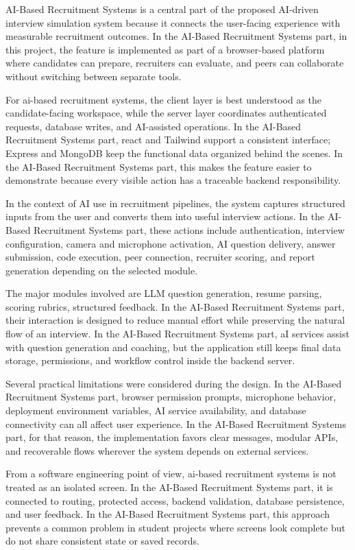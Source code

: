 \documentclass[12pt,a4paper]{report}
\begin{document}
AI-Based Recruitment Systems is a central part of the proposed AI-driven interview simulation system because it connects the user-facing experience with measurable recruitment outcomes. In the AI-Based Recruitment Systems part, in this project, the feature is implemented as part of a browser-based platform where candidates can prepare, recruiters can evaluate, and peers can collaborate without switching between separate tools.


For ai-based recruitment systems, the client layer is best understood as the candidate-facing workspace, while the server layer coordinates authenticated requests, database writes, and AI-assisted operations. In the AI-Based Recruitment Systems part, react and Tailwind support a consistent interface; Express and MongoDB keep the functional data organized behind the scenes. In the AI-Based Recruitment Systems part, this makes the feature easier to demonstrate because every visible action has a traceable backend responsibility.


In the context of AI use in recruitment pipelines, the system captures structured inputs from the user and converts them into useful interview actions. In the AI-Based Recruitment Systems part, these actions include authentication, interview configuration, camera and microphone activation, AI question delivery, answer submission, code execution, peer connection, recruiter scoring, and report generation depending on the selected module.


The major modules involved are LLM question generation, resume parsing, scoring rubrics, structured feedback. In the AI-Based Recruitment Systems part, their interaction is designed to reduce manual effort while preserving the natural flow of an interview. In the AI-Based Recruitment Systems part, aI services assist with question generation and coaching, but the application still keeps final data storage, permissions, and workflow control inside the backend server.


Several practical limitations were considered during the design. In the AI-Based Recruitment Systems part, browser permission prompts, microphone behavior, deployment environment variables, AI service availability, and database connectivity can all affect user experience. In the AI-Based Recruitment Systems part, for that reason, the implementation favors clear messages, modular APIs, and recoverable flows wherever the system depends on external services.


From a software engineering point of view, ai-based recruitment systems is not treated as an isolated screen. In the AI-Based Recruitment Systems part, it is connected to routing, protected access, backend validation, database persistence, and user feedback. In the AI-Based Recruitment Systems part, this approach prevents a common problem in student projects where screens look complete but do not share consistent state or saved records.
\end{document}
